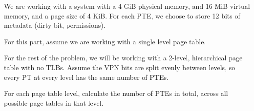 \begin{blocksection}
We are working with a system with a 4 GiB physical memory, and 16 MiB virtual memory, and a page size of 4 KiB. For each PTE, we choose to store 12 bits of metadata (dirty bit, permissions).

\question
For this part, assume we are working with a single level page table.

\question
For the rest of the problem, we will be working with a 2-level, hierarchical page table with no TLBs. Assume the VPN bits are split evenly between levels, so every PT at every level has the same number of PTEs.

For each page table level, calculate the number of PTEs in total, across all possible page tables in that level.
\begin{parts}


\end{parts}
\end{blocksection}
